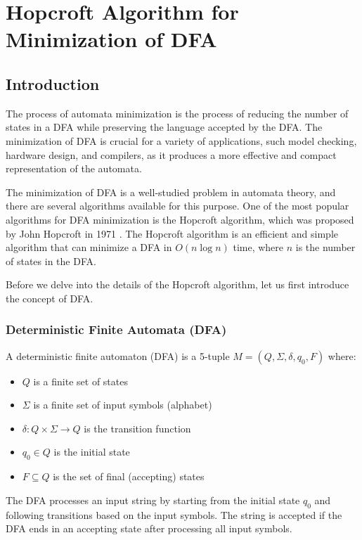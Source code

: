 \chapter{Hopcroft Algorithm for Minimization of DFA}

\section{Introduction}
The process of automata minimization is the process of reducing the number of states in a DFA while preserving the language accepted by the DFA. The minimization of DFA is crucial for a variety of applications, such model checking, hardware
design, and compilers, as it produces a more effective and compact representation of the automata.

The minimization of DFA is a well-studied problem in automata theory, and there are several algorithms available for this purpose. One of the most popular algorithms for DFA minimization is the Hopcroft algorithm, which was proposed by John Hopcroft in 1971 \cite{HOPCROFT1971189}. The Hopcroft algorithm is an efficient and simple algorithm that can minimize a DFA in $O(n \log n)$ time, where $n$ is the number of states in the DFA.

Before we delve into the details of the Hopcroft algorithm, let us first introduce the concept of DFA.
\subsection{Deterministic Finite Automata (DFA)}
A deterministic finite automaton (DFA) is a 5-tuple $M = (Q, \Sigma, \delta, q_0, F)$ where:
\begin{itemize}
    \item $Q$ is a finite set of states
    \item $\Sigma$ is a finite set of input symbols (alphabet)
    \item $\delta: Q \times \Sigma \rightarrow Q$ is the transition function
    \item $q_0 \in Q$ is the initial state
    \item $F \subseteq Q$ is the set of final (accepting) states
\end{itemize}

The DFA processes an input string by starting from the initial state $q_0$ and following transitions based on the input symbols. The string is accepted if the DFA ends in an accepting state after processing all input symbols.

